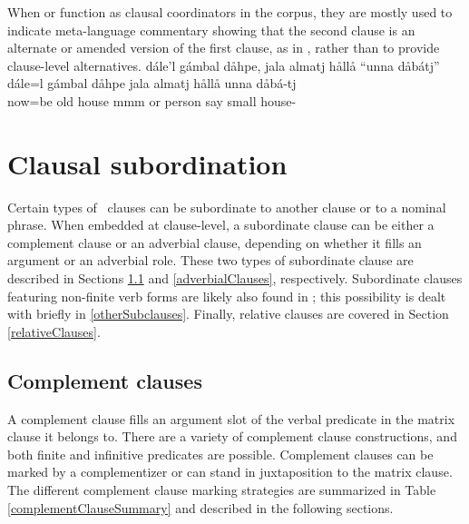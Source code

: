 When  or  function as clausal coordinators in the corpus, 
they are mostly used to indicate meta-language commentary showing that the second clause is an alternate or amended version of the first clause, as in , rather than to provide clause-level alternatives.
\ea\label{ORcoordination1}%
\glll	dále’l gámbal dåhpe, jala almatj hållå “unna dåbátj”\\
	dále=l gámbal dåhpe jala almatj hållå unna dåbá-tj\\
	now=be\BS{} old house\BS{} mmm or person\BS{} say\BS{} small house-\BS{}\\\nopagebreak
{} %
\z


\section{Clausal subordination}\label{clausalSubordination}
Certain types of \PS\ clauses can be subordinate to another clause or to a nominal phrase. %
When embedded at clause-level, a subordinate clause can be either a complement clause or an adverbial clause, depending on whether it fills an argument or an adverbial role. 
These two types of subordinate clause are described in Sections \ref{complementClauses} and \ref{adverbialClauses}, respectively. 
Subordinate clauses featuring non-finite verb forms are likely also found in \PS; this possibility is dealt with briefly in \ref{otherSubclauses}. 
Finally, relative clauses are covered in Section \ref{relativeClauses}.

\subsection{Complement clauses}\label{complementClauses}
A complement clause fills an argument slot of the verbal predicate in the matrix clause it belongs to. 
There are a variety of complement clause constructions, and both finite and infinitive predicates are possible. Complement clauses can be marked by a complementizer %
or can stand in juxtaposition to the matrix clause. %
The different complement clause marking strategies are summarized in Table \vref{complementClauseSummary} and described in the following sections.

